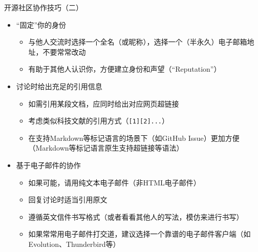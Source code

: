 \begin{frame}{开源社区协作技巧（二）}
	\begin{itemize}
		\item “固定”你的身份
		\begin{itemize}
			\item 与他人交流时选择一个全名（或昵称），选择一个（半永久）电子邮箱地址，不要常常改动
			\item 有助于其他人认识你，方便建立身份和声望（“Reputation”）
		\end{itemize}
		\item 讨论时给出充足的引用信息
		\begin{itemize}
			\item 如需引用某段文档，应同时给出对应网页超链接
			\item 考虑类似科技文献的引用方式（\texttt{[1][2]...}）
			\item 在支持Markdown等标记语言的场景下（如GitHub Issue）更加方便（Markdown等标记语言原生支持超链接等语法）
		\end{itemize}
		\item 基于电子邮件的协作
		\begin{itemize}
			\item 如果可能，请用纯文本电子邮件（非HTML电子邮件）
			\item 回复讨论时适当引用原文
			\item 遵循英文信件书写格式（或者看看其他人的写法，模仿来进行书写）
			\item 如果常常用电子邮件打交道，建议选择一个靠谱的电子邮件客户端（如Evolution、Thunderbird等）
		\end{itemize}

	\end{itemize}	
\end{frame}